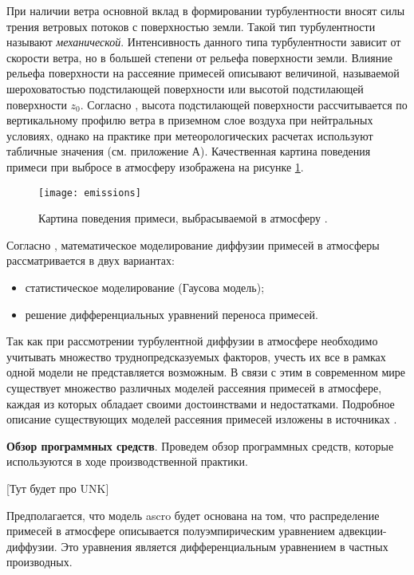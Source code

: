 При наличии ветра основной вклад в формировании турбулентности вносят силы трения ветровых потоков с поверхностью земли. 
Такой тип турбулентности называют \textit{механической}. Интенсивность данного типа турбулентности зависит от скорости 
ветра, но в большей степени от рельефа поверхности земли. Влияние рельефа поверхности на рассеяние примесей описывают 
величиной, называемой шероховатостью подстилающей поверхности или высотой подстилающей поверхности $z_0$. Согласно 
\cite{setton, bizova_meteor, berlyand}, высота подстилающей поверхности рассчитывается по вертикальному профилю ветра в 
приземном слое воздуха при нейтральных условиях, однако на практике при метеорологических расчетах используют табличные 
значения \cite{mlyavaya} (см. приложение А). Качественная картина поведения примеси при выбросе в атмосферу изображена 
на рисунке \ref{fig_emissions}.

\begin{figure}[ht]
\centering
	\texttt{[image: emissions]}
	\captionsetup{justification=centering}
    \caption{Картина поведения примеси, выбрасываемой в атмосферу \cite{gusev_bio}.}
    \label{fig_emissions}
\end{figure}

Согласно \cite{gusev_bio}, математическое моделирование диффузии примесей в атмосферы рассматривается в двух вариантах: 
\begin{itemize}
	\item статистическое моделирование (Гаусова модель);
	\item решение дифференциальных уравнений переноса примесей.
\end{itemize}

Так как при рассмотрении турбулентной диффузии в атмосфере необходимо учитывать множество труднопредсказуемых факторов, 
учесть их все в рамках одной модели не представляется возможным. В связи с этим в современном мире существует множество 
различных моделей рассеяния примесей в атмосфере, каждая из которых обладает своими достоинствами и недостатками. 
Подробное описание существующих моделей рассеяния примесей изложены в источниках \cite{setton, bizova_meteor, berlyand, 
radio_transfer, disper_atmos, met_radio, general_exposure, laihtman, bizova_scatter, disper_models}.

\textbf{Обзор программных средств}. Проведем обзор программных средств, которые используются в ходе производственной 
практики.

[Тут будет про UNK]

Предполагается, что модель \ac{ascro} будет основана на том, что распределение примесей в атмосфере описывается 
полуэмпирическим уравнением адвекции-диффузии. Это уравнения является дифференциальным уравнением в частных производных. 

